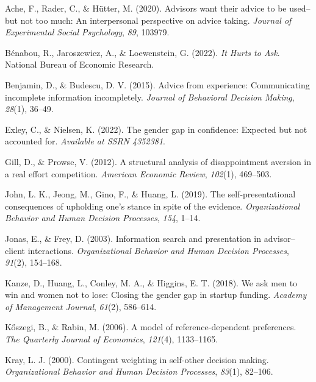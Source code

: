\documentclass[
  man,floatsintext]{apa6}
\newlength{\cslhangindent}
\newlength{\cslentryspacingunit} %
\newenvironment{CSLReferences}[2] %
 {%
  \setlength{\parindent}{0pt}
  \ifodd #1
  \let\oldpar\par
  \def\par{\hangindent=\cslhangindent\oldpar}
  \fi
  \setlength{\parskip}{#2\cslentryspacingunit}
 }%
 {}
\begin{document}
\hypertarget{refs}{}
\begin{CSLReferences}{1}{0}
\leavevmode{}%
Ache, F., Rader, C., \& Hütter, M. (2020). Advisors want their advice to be used--but not too much: {An} interpersonal perspective on advice taking. \emph{Journal of Experimental Social Psychology}, \emph{89}, 103979.

\leavevmode{}%
Bénabou, R., Jaroszewicz, A., \& Loewenstein, G. (2022). \emph{It {Hurts} to {Ask}}. National Bureau of Economic Research.

\leavevmode{}%
Benjamin, D., \& Budescu, D. V. (2015). Advice from experience: {Communicating} incomplete information incompletely. \emph{Journal of Behavioral Decision Making}, \emph{28}(1), 36--49.

\leavevmode{}%
Exley, C., \& Nielsen, K. (2022). The gender gap in confidence: {Expected} but not accounted for. \emph{Available at SSRN 4352381}.

\leavevmode{}%
Gill, D., \& Prowse, V. (2012). A structural analysis of disappointment aversion in a real effort competition. \emph{American Economic Review}, \emph{102}(1), 469--503.

\leavevmode{}%
John, L. K., Jeong, M., Gino, F., \& Huang, L. (2019). The self-presentational consequences of upholding one's stance in spite of the evidence. \emph{Organizational Behavior and Human Decision Processes}, \emph{154}, 1--14.

\leavevmode{}%
Jonas, E., \& Frey, D. (2003). Information search and presentation in advisor--client interactions. \emph{Organizational Behavior and Human Decision Processes}, \emph{91}(2), 154--168.

\leavevmode{}%
Kanze, D., Huang, L., Conley, M. A., \& Higgins, E. T. (2018). We ask men to win and women not to lose: {Closing} the gender gap in startup funding. \emph{Academy of Management Journal}, \emph{61}(2), 586--614.

\leavevmode{}%
Kőszegi, B., \& Rabin, M. (2006). A model of reference-dependent preferences. \emph{The Quarterly Journal of Economics}, \emph{121}(4), 1133--1165.

\leavevmode{}%
Kray, L. J. (2000). Contingent weighting in self-other decision making. \emph{Organizational Behavior and Human Decision Processes}, \emph{83}(1), 82--106.


\end{CSLReferences}
\end{document}
